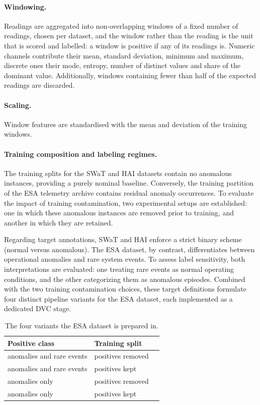 \documentclass{article}
\begin{document}
\paragraph{Windowing.} Readings are aggregated into non-overlapping windows of a fixed
number of readings, chosen per dataset, and the window rather than the reading is the unit
that is scored and labelled: a window is positive if any of its readings is. Numeric
channels contribute their mean, standard deviation, minimum and maximum, discrete ones
their mode, entropy, number of distinct values and share of the dominant value.
Additionally, windows containing fewer than half of the expected readings are discarded.


\paragraph{Scaling.} Window features are standardised with the mean and deviation of the
training windows.

\paragraph{Training composition and labeling regimes.} 
The training splits for the SWaT and HAI datasets contain no anomalous instances, 
providing a purely nominal baseline. 
Conversely, the training partition of the ESA telemetry archive contains residual anomaly occurrences. 
To evaluate the impact of training contamination, two experimental setups are established: 
one in which these anomalous instances are removed prior to training, and another in which they are retained.

Regarding target annotations, 
SWaT and HAI enforce a strict binary scheme (normal versus anomalous). 
The ESA dataset, by contrast, differentiates between operational anomalies and rare system events. 
To assess label sensitivity, both interpretations are evaluated: one treating rare events as normal operating conditions, 
and the other categorizing them as anomalous episodes.
Combined with the two training contamination choices, these target definitions formulate four distinct pipeline variants
for the ESA dataset, each implemented as a dedicated DVC stage.

\begin{table}[t]
  \caption{The four variants the ESA dataset is prepared in.}
  \centering
  \small
  \begin{tabular}{lll}
    \toprule
    Positive class & Training split \\
    \midrule
    anomalies and rare events & positives removed \\
    anomalies and rare events & positives kept\\
    anomalies only            & positives removed \\
    anomalies only            & positives kept    \\
    \bottomrule
  \end{tabular}
  \label{tab:variants}
\end{table}
\end{document}
